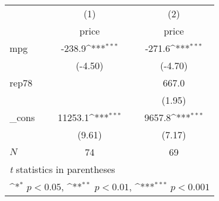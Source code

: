 {
\def\sym#1{\ifmmode^{#1}\else\(^{#1}\)\fi}
\begin{tabular}{l*{2}{c}}
\hline\hline
            &\multicolumn{1}{c}{(1)}&\multicolumn{1}{c}{(2)}\\
            &\multicolumn{1}{c}{price}&\multicolumn{1}{c}{price}\\
\hline
mpg         &      -238.9\sym{***}&      -271.6\sym{***}\\
            &     (-4.50)         &     (-4.70)         \\
[1em]
rep78       &                     &       667.0         \\
            &                     &      (1.95)         \\
[1em]
\_cons      &     11253.1\sym{***}&      9657.8\sym{***}\\
            &      (9.61)         &      (7.17)         \\
\hline
\(N\)       &          74         &          69         \\
\hline\hline
\multicolumn{3}{l}{\footnotesize \textit{t} statistics in parentheses}\\
\multicolumn{3}{l}{\footnotesize \sym{*} \(p<0.05\), \sym{**} \(p<0.01\), \sym{***} \(p<0.001\)}\\
\end{tabular}
}
